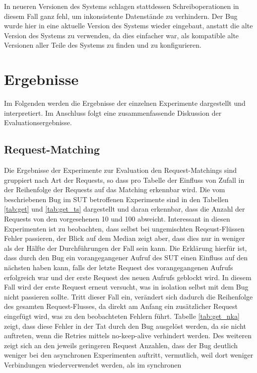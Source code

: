 \documentclass[12pt,a4paper]{report}
\begin{document}
In neueren Versionen des Systems schlagen stattdessen Schreiboperationen in diesem Fall ganz fehl, um inkonsistente Datenstände zu
verhindern. Der Bug wurde hier in eine aktuelle Version des Systems wieder eingebaut, anstatt die alte Version des Systems zu
verwenden, da dies einfacher war, als kompatible alte Versionen aller Teile des Systems zu finden und zu konfigurieren.

\chapter{Ergebnisse}
Im Folgenden werden die Ergebnisse der einzelnen Experimente dargestellt und interpretiert. Im Anschluss folgt eine
zusammenfassende Diskussion der Evaluationsergebnisse.

\section{Request-Matching}
Die Ergebnisse der Experimente zur Evaluation den Request-Matchings sind gruppiert nach Art der Requests, so dass pro Tabelle
der Einfluss von Zufall in der Reihenfolge der Requests auf das Matching erkennbar wird. Die vom beschriebenen Bug im SUT
betroffenen Experimente sind in den Tabellen \ref{tab:get} und \ref{tab:get_ts} dargestellt und daran erkennbar, dass die Anzahl
der Requests von den vorgesehenen 10 und 100 abweicht. Interessant in diesen Experimenten ist zu beobachten, dass selbst bei
ungemischten Reqeust-Flüssen Fehler passieren, der Blick auf dem Median zeigt aber, dass dies nur in weniger als der Hälfte der
Durchführungen der Fall sein kann. Die Erklärung hierfür ist, dass durch den Bug ein vorangegangener Aufruf des SUT einen
Einfluss auf den nächsten haben kann, falls der letzte Request des vorangegangenen Aufrufs erfolgreich war und der erste Request
des neuen Aufrufs geblockt wird. In diesem Fall wird der erste Request erneut versucht, was in isolation selbst mit dem Bug
nicht passieren sollte. Tritt dieser Fall ein, verändert sich dadurch die Reihenfolge des gesamten Request-Flusses, da direkt am
Anfang ein zusätzlicher Request eingefügt wird, was zu den beobachteten Fehlern führt. Tabelle \ref{tab:get_nka} zeigt, dass
diese Fehler in der Tat durch den Bug ausgelöst werden, da sie nicht auftreten, wenn die Retries mittels no-keep-alive
verhindert werden. Des weiteren zeigt sich an den jeweils geringeren Request Anzahlen, dass der Bug deutlich weniger bei den
asynchronen Experimenten auftritt, vermutlich, weil dort weniger Verbindungen wiederverwendet werden, als im synchronen
\end{document}
